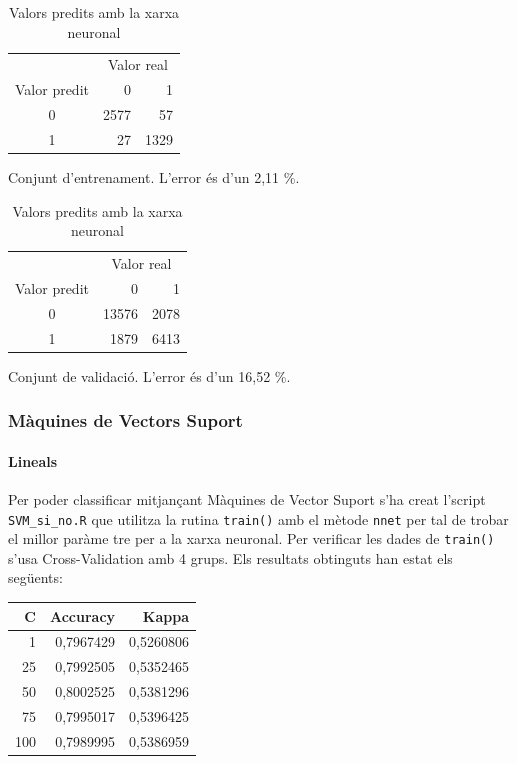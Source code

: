 \documentclass[a4paper]{article}
\begin{document}
\begin{table}[H]
	\def\arraystretch{1.5}
	\begin{subtable}[t]{0.49\textwidth}
		\centering
		\begin{tabular}{|c|rr|}
			\hline
			& \multicolumn{2}{c|}{Valor real} \\
			Valor predit & 0 & 1 \\
			\hline
			0 & 2577 & 57 \\
			1 &   27 & 1329 \\
			\hline
		\end{tabular}
		\caption{Conjunt d'entrenament. L'error és d'un 2,11 \%.}
		\label{tab:nnet_yes_no1}
	\end{subtable}
	\hfill
	\begin{subtable}[t]{0.49\textwidth}
		\centering
		\begin{tabular}{|c|rr|}
			\hline
			& \multicolumn{2}{c|}{Valor real} \\
			Valor predit & 0 & 1 \\
			\hline
			0 & 13576 & 2078 \\
			1 &  1879 & 6413 \\
			\hline
		\end{tabular}
		\caption{Conjunt de validació. L'error és d'un 16,52 \%.}
		\label{tab:nnet_yes_no2}
	\end{subtable}
	\caption{Valors predits amb la xarxa neuronal}
\end{table}

\subsubsection{Màquines de Vectors Suport}
\paragraph{Lineals}

Per poder classificar mitjançant Màquines de Vector Suport s’ha creat l’script \verb|SVM_si_no.R| que utilitza la rutina \verb|train()| amb el mètode \verb|nnet| per tal de trobar el millor paràme	tre per a la xarxa neuronal. Per verificar les dades de \verb|train()| s’usa Cross-Validation amb 4 grups. Els resultats obtinguts han estat els següents: 

\begin{table}[H]
	\centering
	\def\arraystretch{1.2}
	\begin{tabular}{|rrr|}
		\hline
		C & Accuracy & Kappa \\
		\hline
		1 & 0,7967429 & 0,5260806 \\
		25 & 0,7992505 & 0,5352465 \\
		\rowcolor{Orange!40}
		50 & 0,8002525 & 0,5381296 \\
		75 & 0,7995017 & 0,5396425 \\
		100 & 0,7989995 & 0,5386959 \\
		\hline
	\end{tabular}
\end{table}
\end{document}
